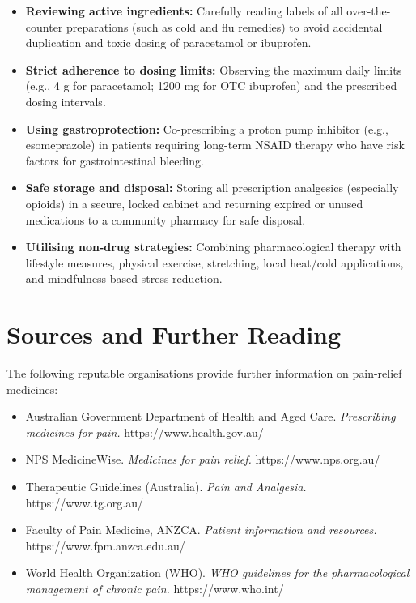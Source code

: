 \begin{itemize}
    \item \textbf{Reviewing active ingredients:} Carefully reading labels of all over-the-counter preparations (such as cold and flu remedies) to avoid accidental duplication and toxic dosing of paracetamol or ibuprofen.
    \item \textbf{Strict adherence to dosing limits:} Observing the maximum daily limits (e.g., 4 g for paracetamol; 1200 mg for OTC ibuprofen) and the prescribed dosing intervals.
    \item \textbf{Using gastroprotection:} Co-prescribing a proton pump inhibitor (e.g., esomeprazole) in patients requiring long-term NSAID therapy who have risk factors for gastrointestinal bleeding.
    \item \textbf{Safe storage and disposal:} Storing all prescription analgesics (especially opioids) in a secure, locked cabinet and returning expired or unused medications to a community pharmacy for safe disposal.
    \item \textbf{Utilising non-drug strategies:} Combining pharmacological therapy with lifestyle measures, physical exercise, stretching, local heat/cold applications, and mindfulness-based stress reduction.
\end{itemize}

\section*{Sources and Further Reading}
The following reputable organisations provide further information on pain-relief medicines:

\begin{itemize}
    \item Australian Government Department of Health and Aged Care. \textit{Prescribing medicines for pain.} https://www.health.gov.au/
    \item NPS MedicineWise. \textit{Medicines for pain relief.} https://www.nps.org.au/
    \item Therapeutic Guidelines (Australia). \textit{Pain and Analgesia.} https://www.tg.org.au/
    \item Faculty of Pain Medicine, ANZCA. \textit{Patient information and resources.} https://www.fpm.anzca.edu.au/
    \item World Health Organization (WHO). \textit{WHO guidelines for the pharmacological management of chronic pain.} https://www.who.int/
\end{itemize}
